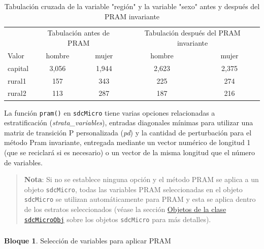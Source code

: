 \documentclass[]{book}
\theoremstyle{definition}
\theoremstyle{definition}
\newtheorem{example}{Bloque}[chapter]
\theoremstyle{definition}
\theoremstyle{definition}
\theoremstyle{remark}
\begin{document}
\begin{table}

\caption{\label{tab:Tabla15}\label{tab:Tabla15}Tabulación cruzada de la variable "región" y la variable "sexo" antes y después del PRAM invariante}
\centering
\begin{tabular}[t]{lcccc}
\toprule
\multicolumn{1}{c}{ } & \multicolumn{2}{c}{Tabulación antes de PRAM} & \multicolumn{2}{c}{Tabulación después del PRAM invariante} \\
\cmidrule(l{3pt}r{3pt}){2-3} \cmidrule(l{3pt}r{3pt}){4-5}
Valor & hombre & mujer & hombre & mujer\\
\midrule
capital & 3,056 & 1,944 & 2,623 & 2,375\\
rural1 & 157 & 343 & 225 & 274\\
rural2 & 113 & 287 & 187 & 216\\
\bottomrule
\end{tabular}
\end{table}

La función \texttt{pram()} en \texttt{sdcMicro} tiene varias opciones relacionadas a estratificación (\emph{strata\_variables}), entradas diagonales mínimas para utilizar una matriz de transición P personalizada (\emph{pd}) y la cantidad de perturbación para el método Pram invariante, entregada mediante un vector numérico de longitud 1 (que se reciclará si es necesario) o un vector de la misma longitud que el número de variables.

\begin{quote}
\textbf{Nota}: Si no se establece ninguna opción y el método PRAM se aplica a un objeto \texttt{sdcMicro}, todas las variables PRAM seleccionadas en el objeto \texttt{sdcMicro} se utilizan automáticamente para PRAM y esta se aplica dentro de los estratos seleccionados (véase la sección \protect\hyperlink{objetos-de-la-clase-sdcmicroobj}{Objetos de la clase \texttt{sdcMicroObj}} sobre los objetos \texttt{sdcMicro} para más detalles).
\end{quote}

\hypertarget{section-1}{%
\subsubsection{}\label{section-1}}

\begin{example}
\protect\hypertarget{exm:bloque27jgm}{}{\label{exm:bloque27jgm} }Selección de variables para aplicar PRAM
\end{example}
\end{document}
